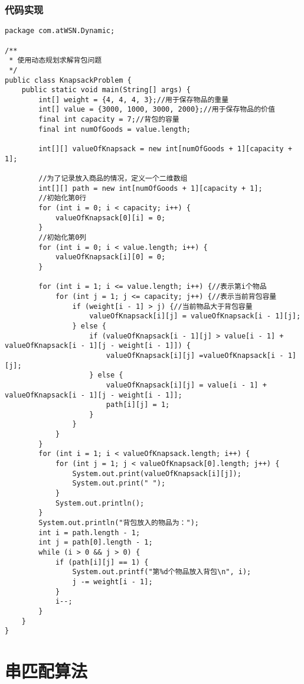 \documentclass[a4paper]{report}
\begin{document}
\subsubsection{代码实现}
\begin{lstlisting}
package com.atWSN.Dynamic;

/**
 * 使用动态规划求解背包问题
 */
public class KnapsackProblem {
    public static void main(String[] args) {
        int[] weight = {4, 4, 4, 3};//用于保存物品的重量
        int[] value = {3000, 1000, 3000, 2000};//用于保存物品的价值
        final int capacity = 7;//背包的容量
        final int numOfGoods = value.length;

        int[][] valueOfKnapsack = new int[numOfGoods + 1][capacity + 1];

        //为了记录放入商品的情况，定义一个二维数组
        int[][] path = new int[numOfGoods + 1][capacity + 1];
        //初始化第0行
        for (int i = 0; i < capacity; i++) {
            valueOfKnapsack[0][i] = 0;
        }
        //初始化第0列
        for (int i = 0; i < value.length; i++) {
            valueOfKnapsack[i][0] = 0;
        }

        for (int i = 1; i <= value.length; i++) {//表示第i个物品
            for (int j = 1; j <= capacity; j++) {//表示当前背包容量
                if (weight[i - 1] > j) {//当前物品大于背包容量
                    valueOfKnapsack[i][j] = valueOfKnapsack[i - 1][j];
                } else {
                    if (valueOfKnapsack[i - 1][j] > value[i - 1] + valueOfKnapsack[i - 1][j - weight[i - 1]]) {
                        valueOfKnapsack[i][j] =valueOfKnapsack[i - 1][j];
                    } else {
                        valueOfKnapsack[i][j] = value[i - 1] + valueOfKnapsack[i - 1][j - weight[i - 1]];
                        path[i][j] = 1;
                    }
                }
            }
        }
        for (int i = 1; i < valueOfKnapsack.length; i++) {
            for (int j = 1; j < valueOfKnapsack[0].length; j++) {
                System.out.print(valueOfKnapsack[i][j]);
                System.out.print(" ");
            }
            System.out.println();
        }
        System.out.println("背包放入的物品为：");
        int i = path.length - 1;
        int j = path[0].length - 1;
        while (i > 0 && j > 0) {
            if (path[i][j] == 1) {
                System.out.printf("第%d个物品放入背包\n", i);
                j -= weight[i - 1];
            }
            i--;
        }
    }
}
\end{lstlisting}
\section{串匹配算法}
\end{document}
